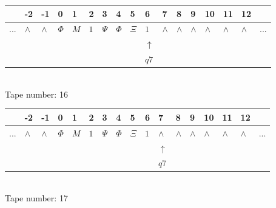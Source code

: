 \documentclass[11pt]{article}
\begin{document}
\begin{table}[H]
\centering
\begin{tabular}{lllllllllllllllll}
 & -2 & -1 & 0 & 1 & 2 & 3 & 4 & 5 & 6 & 7 & 8 & 9 & 10 & 11 & 12 & \\
\hline
$...$ & \multicolumn{1}{|l|}{$\wedge$} & \multicolumn{1}{|l|}{$\wedge$} & \multicolumn{1}{|l|}{$\Phi$} & \multicolumn{1}{|l|}{$M$} & \multicolumn{1}{|l|}{$1$} & \multicolumn{1}{|l|}{$\Psi$} & \multicolumn{1}{|l|}{$\Phi$} & \multicolumn{1}{|l|}{$\Xi$} & \multicolumn{1}{|l|}{$1$} & \multicolumn{1}{|l|}{$\wedge$} & \multicolumn{1}{|l|}{$\wedge$} & \multicolumn{1}{|l|}{$\wedge$} & \multicolumn{1}{|l|}{$\wedge$} & \multicolumn{1}{|l|}{$\wedge$} & \multicolumn{1}{|l|}{$\wedge$} & $...$\\
\hline
&  &  &  &  &  &  &  &  & $\uparrow$ &  &  &  &  &  &  &  \\
&  &  &  &  &  &  &  &  & $ q7 $ &  &  &  &  &  &  &  \\
\end{tabular}
\\
Tape number: 16
\noindent\makebox[\linewidth]{\hdashrule{\textwidth}{1pt}{1pt}}\end{table}

\begin{table}[H]
\centering
\begin{tabular}{lllllllllllllllll}
 & -2 & -1 & 0 & 1 & 2 & 3 & 4 & 5 & 6 & 7 & 8 & 9 & 10 & 11 & 12 & \\
\hline
$...$ & \multicolumn{1}{|l|}{$\wedge$} & \multicolumn{1}{|l|}{$\wedge$} & \multicolumn{1}{|l|}{$\Phi$} & \multicolumn{1}{|l|}{$M$} & \multicolumn{1}{|l|}{$1$} & \multicolumn{1}{|l|}{$\Psi$} & \multicolumn{1}{|l|}{$\Phi$} & \multicolumn{1}{|l|}{$\Xi$} & \multicolumn{1}{|l|}{$1$} & \multicolumn{1}{|l|}{$\wedge$} & \multicolumn{1}{|l|}{$\wedge$} & \multicolumn{1}{|l|}{$\wedge$} & \multicolumn{1}{|l|}{$\wedge$} & \multicolumn{1}{|l|}{$\wedge$} & \multicolumn{1}{|l|}{$\wedge$} & $...$\\
\hline
&  &  &  &  &  &  &  &  &  & $\uparrow$ &  &  &  &  &  &  \\
&  &  &  &  &  &  &  &  &  & $ q7 $ &  &  &  &  &  &  \\
\end{tabular}
\\
Tape number: 17
\noindent\makebox[\linewidth]{\hdashrule{\textwidth}{1pt}{1pt}}\end{table}
\clearpage
\end{document}
